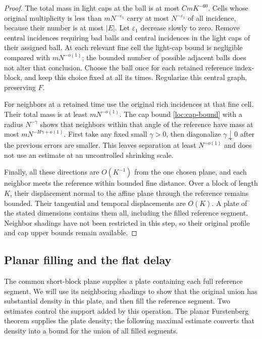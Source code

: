\begin{proof}
The total mass in light caps at the ball is at most $CmK^{-60}$.
Cells whose original multiplicity is less than $mN^{-\varepsilon_1}$
carry at most $N^{-\varepsilon_1}$ of all incidence, because their
number is at most $|E|$.  Let $\varepsilon_1$ decrease slowly to zero.
Remove central incidences requiring bad balls and central incidences
in the light caps of their assigned ball.  At each relevant fine
cell the light-cap bound is negligible compared with
$mN^{-o(1)}$; the bounded number of possible adjacent balls does not
alter that conclusion.  Choose the ball once for each retained
reference index-block, and keep this choice fixed at all its times.
Regularize this central graph, preserving $F$.

For neighbors at a retained time use the original rich incidences at
that fine cell.  Their total mass is at least $mN^{-o(1)}$.
The cap bound \eqref{loc:cap-bound} with a radius $N^{-\gamma}$
shows that neighbors within that angle of the reference have mass
at most $mN^{-H\gamma+o(1)}$.  First take any fixed small
$\gamma>0$, then diagonalize $\gamma\downarrow0$ after the previous
errors are smaller.  This leaves separation at least $N^{-o(1)}$
and does not use an estimate at an uncontrolled shrinking scale.

Finally, all these directions are $O(K^{-1})$ from the one chosen
plane, and each neighbor meets the reference within bounded fine
distance.  Over a block of length $K$, their displacement normal
to the affine plane through the reference remains bounded.  Their
tangential and temporal displacements are $O(K)$.  A plate of the
stated dimensions contains them all, including the filled reference
segment.  Neighbor shadings have not been restricted in this step,
so their original profile and cap upper bounds remain available.
\end{proof}

\subsection{Planar filling and the flat delay}

The common short-block plane supplies a plate containing each full
reference segment.  We will use its neighboring shadings to show
that the original union has substantial density in this plate, and
then fill the reference segment.  Two estimates control the support
added by this operation.  The planar Furstenberg theorem supplies
the plate density; the following maximal estimate converts that
density into a bound for the union of all filled segments.

